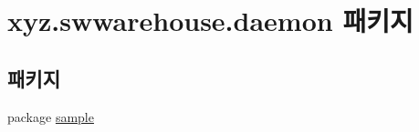 \hypertarget{namespacexyz_1_1swwarehouse_1_1daemon}{\section{xyz.\+swwarehouse.\+daemon 패키지}
\label{namespacexyz_1_1swwarehouse_1_1daemon}
}
\subsection*{패키지}
\begin{DoxyCompactItemize}
\item 
package \hyperlink{namespacexyz_1_1swwarehouse_1_1daemon_1_1sample}{sample}
\end{DoxyCompactItemize}

